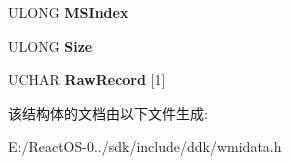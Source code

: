 \begin{DoxyCompactItemize}
\item 
\mbox{\label{struct___m_s_m_c_a_event___c_p_u_error_a76a0b8654aa025221c00b54211d6043e}} 
U\+L\+O\+NG {\bfseries M\+S\+Index}
\item 
\mbox{\label{struct___m_s_m_c_a_event___c_p_u_error_ad6ba39f1fcff72224c49920852ee7af3}} 
U\+L\+O\+NG {\bfseries Size}
\item 
\mbox{\label{struct___m_s_m_c_a_event___c_p_u_error_a060ea4436e22ec17a86566c5b73d9be0}} 
U\+C\+H\+AR {\bfseries Raw\+Record} \mbox{[}1\mbox{]}
\end{DoxyCompactItemize}


该结构体的文档由以下文件生成\+:\begin{DoxyCompactItemize}
\item 
E\+:/\+React\+O\+S-\/0../sdk/include/ddk/wmidata.\+h\end{DoxyCompactItemize}

